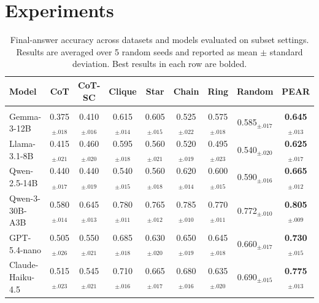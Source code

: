 \section{Experiments}
\label{sec:experiments}


\begin{table}[t]
\centering
\fontsize{8}{8.5}\selectfont
\setlength{\tabcolsep}{3.5pt}
\renewcommand{\arraystretch}{1.15}

\caption{
Final-answer accuracy across datasets and models evaluated on subset settings.
Results are averaged over 5 random seeds and reported as mean $\pm$ standard deviation.
Best results in each row are bolded.
}
\label{tab:main-results}

\begin{tabular}{lcccccccc}
\toprule


\textbf{Model} &
\textbf{CoT} &
\textbf{CoT-SC} &
\textbf{Clique} &
\textbf{Star} &
\textbf{Chain} &
\textbf{Ring} &
\textbf{Random} &
\textbf{PEAR} \\
\midrule

\rowcolor{gray!10}
\multicolumn{9}{c}{\textbf{MMLU-Pro}} \\
\midrule

 Gemma-3-12B      & 0.375$_{\pm .018}$ & 0.410$_{\pm .016}$ & 0.615$_{\pm .014}$ & 0.605$_{\pm .015}$ & 0.525$_{\pm .022}$ & 0.575$_{\pm .018}$ & 0.585$_{\pm .017}$ & \textbf{\cellcolor{blue!6}0.645$_{\pm .013}$} \\
 Llama-3.1-8B     & 0.415$_{\pm .021}$ & 0.460$_{\pm .020}$ & 0.595$_{\pm .018}$ & 0.560$_{\pm .021}$ & 0.520$_{\pm .019}$ & 0.495$_{\pm .023}$ & 0.540$_{\pm .020}$ & \textbf{\cellcolor{blue!6}0.625$_{\pm .017}$} \\
 Qwen-2.5-14B     & 0.440$_{\pm .017}$ & 0.440$_{\pm .019}$ & 0.540$_{\pm .015}$ & 0.560$_{\pm .018}$ & 0.620$_{\pm .014}$ & 0.600$_{\pm .015}$ & 0.590$_{\pm .016}$ & \textbf{\cellcolor{blue!6}0.665$_{\pm .012}$} \\
 Qwen-3-30B-A3B   & 0.580$_{\pm .014}$ & 0.645$_{\pm .013}$ & 0.780$_{\pm .011}$ & 0.765$_{\pm .012}$ & 0.785$_{\pm .010}$ & 0.770$_{\pm .011}$ & 0.772$_{\pm .010}$ & \textbf{\cellcolor{blue!6}0.805$_{\pm .009}$} \\
 GPT-5.4-nano     & 0.505$_{\pm .026}$ & 0.550$_{\pm .021}$ & 0.685$_{\pm .018}$ & 0.630$_{\pm .020}$ & 0.650$_{\pm .019}$ & 0.645$_{\pm .018}$ & 0.660$_{\pm .017}$ & \textbf{\cellcolor{blue!6}0.730$_{\pm .015}$} \\
 Claude-Haiku-4.5 & 0.515$_{\pm .023}$ & 0.545$_{\pm .021}$ & 0.710$_{\pm .016}$ & 0.665$_{\pm .017}$ & 0.680$_{\pm .016}$ & 0.635$_{\pm .020}$ & 0.690$_{\pm .015}$ & \textbf{\cellcolor{blue!6}0.775$_{\pm .013}$} \\
\midrule


\end{tabular}
\end{table}

